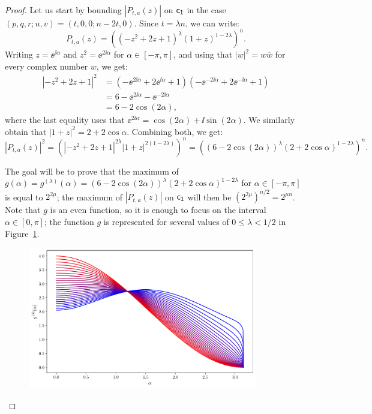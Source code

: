 \documentclass{llncs}
\begin{document}
\begin{proof}
    Let us start by bounding $|P_{t,a}(z)|$ on $\mathsf{c_1}$ in the case $(p,q,r;u,v)=(t,0,0;n-2t,0)$. Since $t=\lambda n$, we can write:
    \[
        P_{t,a}(z)=\left((-z^2+2z+1)^{\lambda}(1+z)^{1-2\lambda}\right)^n.
    \]
    Writing $z=\ee^{\ii\alpha}$ and $z^2=\ee^{2\ii\alpha}$ for $\alpha\in[-\pi,\pi]$, and using that $|w|^2=w\overline w$ for every complex number $w$, we get:
    \begin{align*}
        |-z^2+2z+1|^2&=\left(-\ee^{2\ii\alpha}+2\ee^{\ii\alpha}+1\right)\left(-\ee^{-2\ii\alpha}+2\ee^{-\ii\alpha}+1\right)\\
        &=6-\ee^{2\ii\alpha}-\ee^{-2\ii\alpha}\\
        &=6-2\cos (2\alpha),
    \end{align*}
    where the last equality uses that $\ee^{2\ii\alpha}=\cos(2\alpha)+\ii\sin(2\alpha)$. We similarly obtain that $|1+z|^2=2+2\cos\alpha$. Combining both, we get:   
    \[
        |P_{t,a}(z)|^2=\left(\left|-z^2+2z+1\right|^{2\lambda}|1+z|^{2(1-2\lambda)}\right)^n=\left((6-2\cos(2\alpha))^\lambda(2+2\cos\alpha)^{1-2\lambda}\right)^n.
    \]
    
    The goal will be to prove that the maximum of $g(\alpha)=g^{(\lambda)}(\alpha)=(6-2\cos(2\alpha))^\lambda(2+2\cos\alpha)^{1-2\lambda}$ for $\alpha\in[-\pi,\pi]$ is equal to $2^{2\mu}$; the maximum of $|P_{t,a}(z)|$ on $\mathsf{c_1}$ will then be $\left(2^{2\mu}\right)^{n/2}=2^{\mu n}$. Note that $g$ is an even function, so it is enough to focus on the interval $\alpha\in[0,\pi]$; the function $g$ is represented for several values of $0\leq\lambda<1/2$ in Figure~\ref{fig:family_curves_g}.

    \begin{figure}[ht]
    	\centering
    	\includegraphics[width=10cm]{family_curves_g.pdf}
        \vspace{-4mm}
    	\label{fig:family_curves_g}
    \end{figure}
    

\end{proof}
\end{document}
